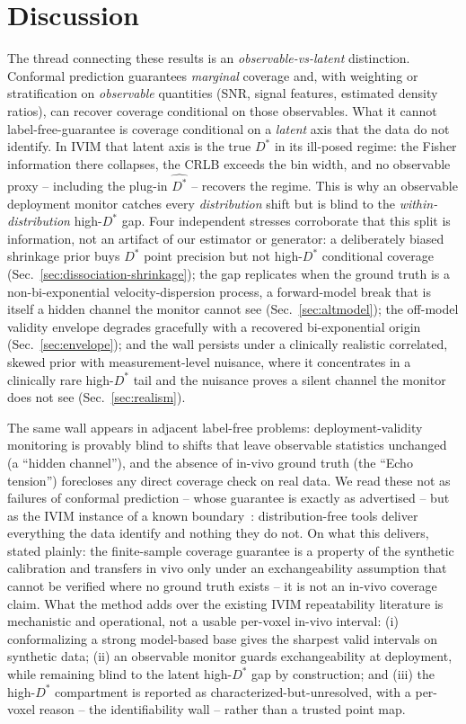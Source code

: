 \documentclass[11pt]{article}
\newcommand{\Dstar}{D^{*}}
\begin{document}
\section{Discussion}
The thread connecting these results is an \emph{observable-vs-latent} distinction.
Conformal prediction guarantees \emph{marginal} coverage and, with weighting or
stratification on \emph{observable} quantities (SNR, signal features, estimated
density ratios), can recover coverage conditional on those observables. What it
cannot label-free-guarantee is coverage conditional on a \emph{latent} axis that
the data do not identify. In IVIM that latent axis is the true $\Dstar$ in its
ill-posed regime: the Fisher information there collapses, the CRLB exceeds the bin
width, and no observable proxy -- including the plug-in $\hat{\Dstar}$ -- recovers
the regime. This is why an observable deployment monitor catches every
\emph{distribution} shift but is blind to the \emph{within-distribution} high-$\Dstar$
gap. Four independent stresses corroborate that this split is information, not an
artifact of our estimator or generator: a deliberately biased shrinkage prior buys
$\Dstar$ point precision but not high-$\Dstar$ conditional coverage
(Sec.~\ref{sec:dissociation-shrinkage}); the gap replicates when the ground truth is
a non-bi-exponential velocity-dispersion process, a forward-model break that is
itself a hidden channel the monitor cannot see (Sec.~\ref{sec:altmodel}); the
off-model validity envelope degrades gracefully with a recovered bi-exponential
origin (Sec.~\ref{sec:envelope}); and the wall persists under a clinically realistic
correlated, skewed prior with measurement-level nuisance, where it concentrates in a
clinically rare high-$\Dstar$ tail and the nuisance proves a silent channel the
monitor does not see (Sec.~\ref{sec:realism}).

The same wall appears in adjacent label-free problems: deployment-validity
monitoring is provably blind to shifts that leave observable statistics unchanged
(a ``hidden channel''), and the absence of in-vivo ground truth (the ``Echo
tension'') forecloses any direct coverage check on real data. We read these not as
failures of conformal prediction -- whose guarantee is exactly as advertised -- but
as the IVIM instance of a known boundary~\citep{barber2021limits}:
distribution-free tools deliver everything the data identify and nothing they do
not. On what this delivers, stated plainly: the finite-sample coverage guarantee is
a property of the synthetic calibration and transfers in vivo only under an
exchangeability assumption that cannot be verified where no ground truth exists --
it is not an in-vivo coverage claim. What the method adds over the existing IVIM
repeatability literature is mechanistic and operational, not a usable per-voxel
in-vivo interval: (i) conformalizing a strong model-based base gives the sharpest
valid intervals on synthetic data; (ii) an observable monitor guards exchangeability
at deployment, while remaining blind to the latent high-$\Dstar$ gap by
construction; and (iii) the high-$\Dstar$ compartment is reported as
characterized-but-unresolved, with a per-voxel reason -- the identifiability wall --
rather than a trusted point map.
\end{document}
